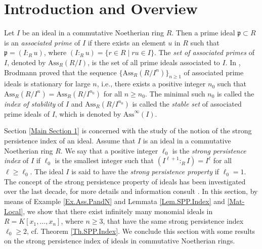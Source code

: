 \documentclass[11pt]{amsart}
\begin{document}

 
\section{Introduction and Overview}



Let $I$ be an ideal in a commutative  Noetherian ring $R$. Then a prime ideal $\mathfrak{p}\subset  R$ is an {\it associated prime} of $I$ if there exists
 an element $u$ in $R$ such that $\mathfrak{p}=(I:_R u)$, where $(I:_R u)=\{r\in R \mid  ru\in I\}$. The  {\it set of associated primes} of $I$, denoted by  $\mathrm{Ass}_R(R/I)$, is the set of all prime ideals associated to  $I$. In  \cite{BR}, Brodmann proved  that the sequence $\{\mathrm{Ass}_R(R/I^n)\}_{n \geq 1}$ of associated prime ideals is stationary  for large $n$, i.e., there exists a positive integer $n_0$ such that $\mathrm{Ass}_R(R/I^n)=\mathrm{Ass}_R(R/I^{n_0})$ for all $n\geq n_0$. The  minimal such $n_0$ is called the {\it index of stability}   of  $I$ and $\mathrm{Ass}_R(R/I^{n_0})$ is called the {\it stable set } 
 of associated prime ideals of  $I$, which is denoted by $\mathrm{Ass}^{\infty }(I).$
 
 
 
 
 Section \ref{Main Section 1} is concerned with the study of the notion of the strong persistence index of an ideal.
 Assume that $I$ is an ideal in   a commutative  Noetherian ring $R$. We say that a positive integer  $\ell_0$ is the \textit{strong persistence index} of $I$ if $\ell_0$ is the smallest integer such that $(I^{\ell+1}:_RI)=I^{\ell}$ for all  $\ell\geq \ell_0$.  The  ideal $I$ is said to have the  {\it strong persistence property} if  $\ell_0=1$.  The concept    of the strong persistence property of ideals has been investigated  over the last decade, for more details and information consult  \cite{ANR2, BNT, KNT, N2, NKA, RNA, RT}.
 In this section, by means of Example \ref{Ex.Ass.PandN} and  Lemmata  \ref{Lem.SPP.Index} and \ref{Mat-Local},  we show that  there exist infinitely many  monomial ideals  in   $R=K[x_1, \ldots, x_n]$, where $n\geq 3$,   that  have  the  same  strong persistence index $\ell_0\geq 2$, cf.   Theorem \ref{Th.SPP.Index}.  
 We conclude this section with some results on the strong persistence index of ideals in commutative Noetherian rings.
 
\end{document}
